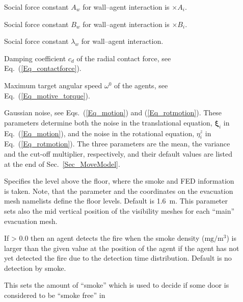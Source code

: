 \documentclass[12pt,a4paper,final,twoside]{stylevk}
\begin{document}
\begin{description}
%
\item[] Social force constant $A_w$ for
  wall--agent interaction is $\times A_i$.
%
\item[] Social force constant $B_w$ for
  wall--agent interaction is $\times B_i$.
%
\item[] Social force constant $\lambda_w$ for
  wall--agent interaction.
%
\item[] Damping coefficient $c_d$ of the radial
  contact force, see Eq.~(\ref{Eq_contactforce}).
%
\item[] Maximum target angular speed $\omega^0$ of
  the agents, see Eq.~(\ref{Eq_motive_torque}).
%
\item[] Gaussian noise, see
  Eqs.~(\ref{Eq_motion}) and (\ref{Eq_rotmotion}).  These parameters
  determine both the noise in the translational equation,
  ${\boldsymbol \xi}_i$ in Eq.~(\ref{Eq_motion}), and the noise in the
  rotational equation, ${\eta}^z_{i}$ in Eq.~(\ref{Eq_rotmotion}). The
  three parameters are the mean, the variance and the cut-off
  multiplier, respectively, and their default values are listed at the
  end of Sec.~\ref{Sec_MoveModel}.
%
%
\item[] Specifies the level above the
  floor, where the smoke and FED information is taken.  Note, that the
  parameter  and the coordinates  on
  the evacuation mesh namelists define the floor levels.  Default is
  1.6~m.  This parameter sets also the mid vertical position of the
  visibility meshes for each ``main'' evacuation mesh.
%
\item[] If > 0.0 then an agent detects the
  fire when the smoke density ($\mathrm{mg/m^3}$) is larger than the
  given value at the position of the agent if the agent has not yet
  detected the fire due to the detection time distribution.  Default
  is no detection by smoke.
%
\item[] This sets the amount of ``smoke'' which
  is used to decide if some door is considered to be ``smoke free'' in

\end{description}
\end{document}
